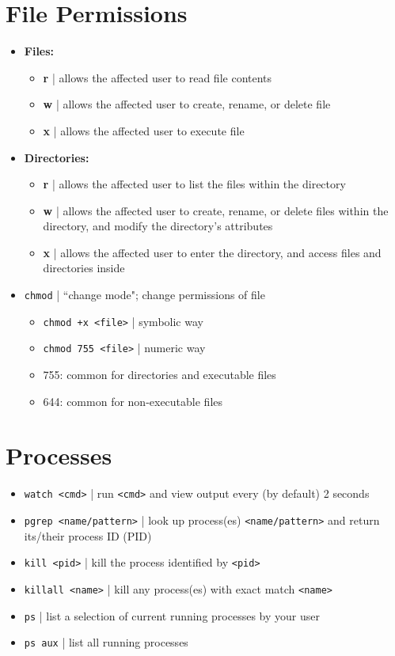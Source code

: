 \documentclass{article}
\begin{document}
\begin{multicols}{2}
\section{File Permissions}
\begin{itemize}
	\item \textbf{Files:}
	\begin{itemize}
		\item \textbf{r} | allows the affected user to read file contents
		\item \textbf{w} | allows the affected user to create, rename, or delete file
		\item \textbf{x} | allows the affected user to execute file
	\end{itemize}
	\item \textbf{Directories:}
	\begin{itemize}
		\item \textbf{r} | allows the affected user to list the files within the directory
		\item \textbf{w} | allows the affected user to create, rename, or delete files within the directory, and modify the directory's attributes
		\item \textbf{x} | allows the affected user to enter the directory, and access files and directories inside
	\end{itemize}
	\item \texttt{chmod} | ``change mode"; change permissions of file
	\begin{itemize}
		\item \texttt{chmod +x <file>} | symbolic way
		\item \texttt{chmod 755 <file>} | numeric way
		\item 755: common for directories and executable files
		\item 644: common for non-executable files
	\end{itemize}
\end{itemize}

\section{Processes}
\begin{itemize}
	\item \texttt{watch <cmd>} | run \texttt{<cmd>} and view output every (by default) 2 seconds
	\item \texttt{pgrep <name/pattern>} | look up process(es) \texttt{<name/pattern>} and return its/their process ID (PID)
	\item \texttt{kill <pid>} | kill the process identified by \texttt{<pid>}
	\item \texttt{killall <name>} | kill any process(es) with exact match \texttt{<name>}
	\item \texttt{ps} | list a selection of current running processes by your user
	\item \texttt{ps aux} | list all running processes
\end{itemize}
\end{multicols}
\end{document}
